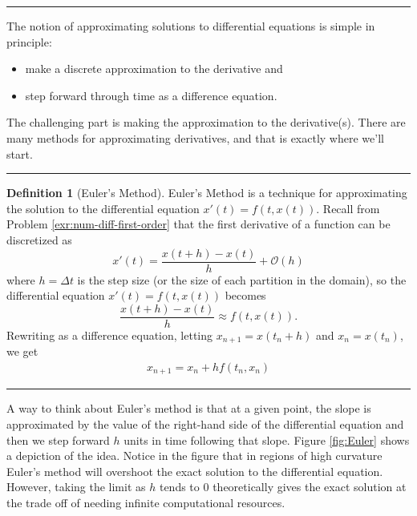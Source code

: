 \documentclass[
]{book}
\providecommand{\tightlist}{%
  \setlength{\itemsep}{0pt}\setlength{\parskip}{0pt}}
\theoremstyle{definition}
\newtheorem{definition}{Definition}[chapter]
\theoremstyle{definition}
\theoremstyle{definition}
\theoremstyle{remark}
\begin{document}
\begin{center}\rule{0.5\linewidth}{0.5pt}\end{center}

The notion of approximating solutions to differential equations is simple in principle:

\begin{itemize}
\tightlist
\item
  make a discrete approximation to the derivative and
\item
  step forward through time as a difference equation.
\end{itemize}

The challenging part is making the approximation to the derivative(s). There are many methods for approximating derivatives, and that is exactly where we'll start.

\begin{center}\rule{0.5\linewidth}{0.5pt}\end{center}

\begin{definition}[Euler's Method]
\protect\hypertarget{def:unnamed-chunk-423}{}{\label{def:unnamed-chunk-423} {} }Euler's Method is a technique for approximating the
solution to the differential equation \(x'(t) = f(t,x(t))\). Recall from Problem \ref{exr:num-diff-first-order} that the first derivative of a function can be discretized as
\[x'(t) = \frac{x(t+h) - x(t)}{h} + \mathcal{O}(h)\] where \(h = \Delta t\) is the step size (or the size of each partition in the domain), so the differential
equation \(x'(t) = f(t,x(t))\) becomes
\[\frac{x(t+h) - x(t)}{h} \approx f(t,x(t)).\] Rewriting as a difference
equation, letting \(x_{n+1} = x(t_n+h)\) and \(x_n = x(t_n)\), we get
\[\begin{aligned}
        x_{n+1} = x_n + h f(t_n,x_n)
        \label{eqn:Eulers_method}
    \end{aligned}\]
\end{definition}

\begin{center}\rule{0.5\linewidth}{0.5pt}\end{center}

A way to think about Euler's method is that at a given point, the slope is approximated by the value of the right-hand side of the differential equation and then we step forward \(h\) units in time following that slope. Figure \ref{fig:Euler} shows a depiction of the idea. Notice in the figure that in regions of high curvature Euler's method will overshoot the exact solution to the differential equation. However, taking the limit as \(h\) tends to \(0\) theoretically gives the exact solution at the trade off of needing infinite computational resources.
\end{document}
